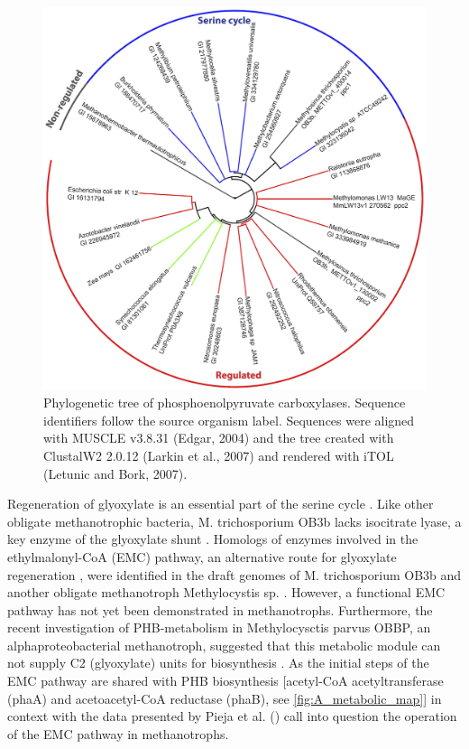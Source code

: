 \begin{figure}[H]
\centering
     \includegraphics[width=1.0\textwidth]{./tex/chapter1/figures/figure3.png}
     \begin{singlespace}
     \caption[Phylogenetic tree of phosphoenolpyruvate carboxylases.]{
        Phylogenetic tree of phosphoenolpyruvate carboxylases.
        Sequence identifiers follow the source organism label. Sequences were aligned with MUSCLE v3.8.31 (Edgar, 2004) and
        the tree created with ClustalW2 2.0.12 (Larkin et al., 2007) and rendered with iTOL (Letunic and Bork, 2007).}
     \end{singlespace}
     \label{fig:B_pep}
\end{figure}

Regeneration of glyoxylate is an essential part of the serine cycle \cite{anthony1982, anthony2011, peyraud2009}.
Like other obligate methanotrophic bacteria, M. trichosporium OB3b lacks isocitrate lyase, a key enzyme of the glyoxylate shunt \cite{trotsenko2008}.
Homologs of enzymes involved in the ethylmalonyl-CoA (EMC) pathway, an alternative route for glyoxylate regeneration \cite{peyraud2009}, were identified in the draft genomes of M. trichosporium OB3b and another obligate methanotroph Methylocystis sp. \cite{stein2010, stein2011}.
However, a functional EMC pathway has not yet been demonstrated in methanotrophs.
Furthermore, the recent investigation of PHB-metabolism in Methylocysctis parvus OBBP, an alphaproteobacterial methanotroph, suggested that this metabolic module can not supply C2 (glyoxylate) units for biosynthesis \cite{pieja2011}.
As the initial steps of the EMC pathway are shared with PHB biosynthesis [acetyl-CoA acetyltransferase (phaA) and acetoacetyl-CoA reductase (phaB), see \ref{fig:A_metabolic_map}] in context with the data presented by Pieja et al. (\cite{pieja2011}) call into question the operation of the EMC pathway in methanotrophs.

